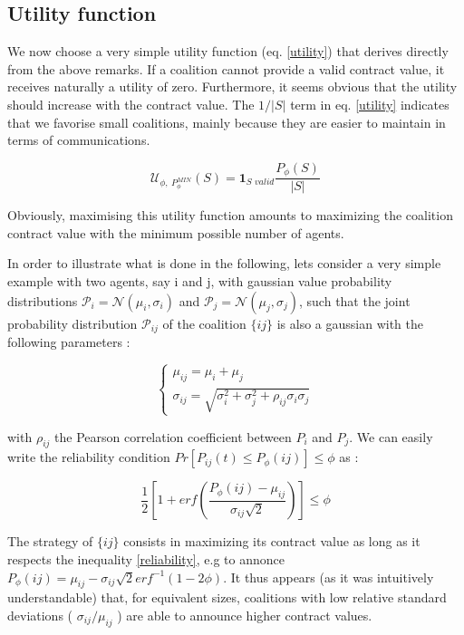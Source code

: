 \documentclass[conference]{IEEEtran}
\begin{document}
\subsection{Utility function}\label{subsec:UtilityFunc}
We now choose a very simple utility function (eq. \ref{utility}) that derives directly from the above remarks. If a coalition cannot provide a valid contract value, it receives naturally a utility of zero. Furthermore, it seems obvious that the utility should increase with the contract value. The $ 1/|S| $ term in eq. \ref{utility} indicates that we favorise small coalitions, mainly because they are easier to maintain in terms of communications.

\begin{equation}
 \mathcal{U}_{\phi,\ P_{\phi}^{MIN}}(S) = \mathbf{1}_{\textit{S\ valid}} \dfrac{P_{\phi}(S)}{|S|} 
\label{utility}
\end{equation}

Obviously, maximising this utility function amounts to maximizing the coalition contract value with the minimum possible number of agents. 

In order to illustrate what is done in the following, lets consider a very simple example with two agents, say i and j, with gaussian value probability distributions $ \mathcal{P}_{i} = \mathcal{N}(\mu_{i}, \sigma_{i}) $ and $ \mathcal{P}_{j} = \mathcal{N}(\mu_{j}, \sigma_{j}) $, such that the joint probability distribution  $ \mathcal{P}_{ij} $ of the coalition $\{ij\}$ is also a gaussian with the following parameters :

\begin{equation}
\left\{ \begin{array}{lll}
		\mu_{ij} = \mu_{i} + \mu_{j} \\
		\sigma_{ij} = \sqrt{\sigma_{i}^{2} + \sigma_{j}^{2} + \rho_{ij}\sigma_{i}\sigma_{j}}
\end{array} \right.
\label{parameters}
\end{equation}

with $ \rho_{ij} $ the Pearson correlation coefficient between $ P_{i} $ and $ P_{j} $. We can easily write the reliability condition $ Pr[P_{ij}(t) \leq P_{\phi}(ij) ] \leq \phi $ as :

\begin{equation}
\dfrac{1}{2} \left[ 1+ erf \left( \dfrac{P_{\phi}(ij) - \mu_{ij}}{\sigma_{ij}\sqrt{2}} \right) \right] \leq \phi
\label{reliability}
\end{equation}

The strategy of $ \{ij\} $ consists in maximizing its contract value as long as it respects the inequality \ref{reliability}, e.g to annonce $ P_{\phi}(ij) = \mu_{ij} - \sigma_{ij}\sqrt{2}erf^{-1}(1-2 \phi ) $. It thus appears (as it was intuitively understandable) that, for equivalent sizes, coalitions with low relative standard deviations ( $ \sigma_{ij} / \mu_{ij} $ ) are able to announce higher contract values. 
\end{document}
